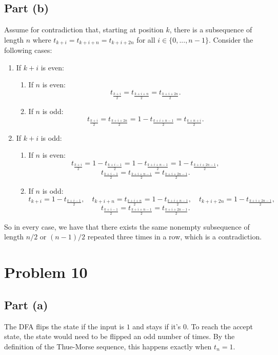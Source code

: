 \documentclass{article}
\begin{document}
\subsection*{Part (b)}
Assume for contradiction that, starting at position $k$, there is a subsequence of length $n$ where $t_{k + i} = t_{k + i + n} = t_{k + i + 2n}$ for all $i \in \{0, ..., n - 1\}$. Consider the following cases:
\begin{enumerate}
    \item If $k + i$ is even:
    \begin{enumerate}
        \item If $n$ is even:
        $$t_{\frac{k + i}{2}} = t_{\frac{k + i + n}{2}} = t_{\frac{k + i + 2n}{2}}.$$
        \item If $n$ is odd:
        $$t_{\frac{k + i}{2}} = t_{\frac{k + i + 2n}{2}} = 1 - t_{\frac{k + i + n - 1}{2}} = t_{\frac{k + n + i}{2}}.$$
    \end{enumerate}
    \item If $k + i$ is odd:
    \begin{enumerate}
        \item If $n$ is even:
        $$t_{\frac{k + i}{2}} = 1 - t_{\frac{k + i - 1}{2}} = 1 - t_{\frac{k + i + n - 1}{2}} = 1 - t_{\frac{k + i + 2n - 1}{2}},$$
        $$t_{\frac{k + i - 1}{2}} = t_{\frac{k + i + n - 1}{2}} = t_{\frac{k + i + 2n - 1}{2}}.$$
        \item If $n$ is odd:
        $$t_{k + i} = 1 - t_{\frac{k + i - 1}{2}}, \quad t_{k + i + n} = t_{\frac{k + i + n}{2}} = 1 - t_{\frac{k + i + n - 1}{2}}, \quad t_{k + i + 2n} = 1 - t_{\frac{k + i + 2n - 1}{2}},$$
        $$t_{\frac{k + i - 1}{2}} = t_{\frac{k + i + n - 1}{2}} = t_{\frac{k + i + 2n - 1}{2}}.$$
    \end{enumerate}
\end{enumerate}
So in every case, we have that there exists the same nonempty subsequence of length $n/2$ or $(n - 1)/2$ repeated three times in a row, which is a contradiction.

\section*{Problem 10}
\subsection*{Part (a)}
The DFA flips the state if the input is $1$ and stays if it's $0$. To reach the accept state, the state would need to be flipped an odd number of times. By the definition of the Thue-Morse sequence, this happens exactly when $t_n = 1$.
\end{document}
